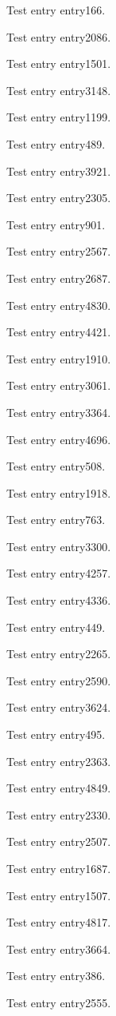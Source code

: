 Test entry \gls{entry166}.

Test entry \gls{entry2086}.

Test entry \gls{entry1501}.

Test entry \gls{entry3148}.

Test entry \gls{entry1199}.

Test entry \gls{entry489}.

Test entry \gls{entry3921}.

Test entry \gls{entry2305}.

Test entry \gls{entry901}.

Test entry \gls{entry2567}.

Test entry \gls{entry2687}.

Test entry \gls{entry4830}.

Test entry \gls{entry4421}.

Test entry \gls{entry1910}.

Test entry \gls{entry3061}.

Test entry \gls{entry3364}.

Test entry \gls{entry4696}.

Test entry \gls{entry508}.

Test entry \gls{entry1918}.

Test entry \gls{entry763}.

Test entry \gls{entry3300}.

Test entry \gls{entry4257}.

Test entry \gls{entry4336}.

Test entry \gls{entry449}.

Test entry \gls{entry2265}.

Test entry \gls{entry2590}.

Test entry \gls{entry3624}.

Test entry \gls{entry495}.

Test entry \gls{entry2363}.

Test entry \gls{entry4849}.

Test entry \gls{entry2330}.

Test entry \gls{entry2507}.

Test entry \gls{entry1687}.

Test entry \gls{entry1507}.

Test entry \gls{entry4817}.

Test entry \gls{entry3664}.

Test entry \gls{entry386}.

Test entry \gls{entry2555}.

